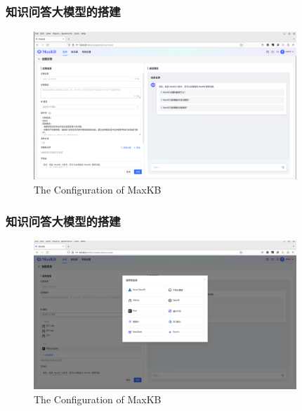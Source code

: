 \begin{frame}
	\frametitle{知识问答大模型的搭建}
\begin{figure}[h!]
\centering
\vskip -8pt
\includegraphics[height=2.2in,width=3.90in,viewport=3 0 1848 1041,clip]{Figures/MaxKB_Creat-APP.png}
\caption{\tiny\textrm{The Configuration of MaxKB}}%
\label{Fig:MaxKB_Creat-APP}
\end{figure}
\end{frame}

\begin{frame}
	\frametitle{知识问答大模型的搭建}
\begin{figure}[h!]
\centering
\vskip -8pt
\includegraphics[height=2.20in,width=3.90in,viewport=0 0 1850 1041,clip]{Figures/MaxKB_Chose-Model.png}
\caption{\tiny\textrm{The Configuration of MaxKB}}%
\label{Fig:MaxKB_Chose-Model}
\end{figure}
\end{frame}

